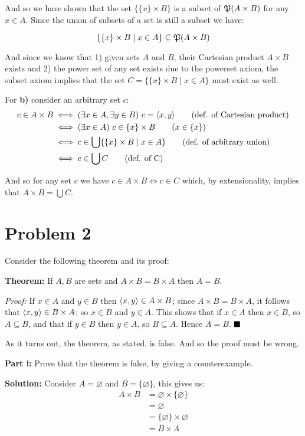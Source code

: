 \documentclass{article}
\begin{document}
And so we have shown that the set $\{\{x\}\times B\}$ is a subset of $\mathfrak P(A\times B)$ for any $x\in A$. Since the union of subsets of a set is still a subset we have:

\begin{equation*}
    \{\{x\}\times B\mid x\in A\}\subseteq \mathfrak P(A\times B)
\end{equation*}

And since we know that 1) given sets $A$ and $B$, their Cartesian product $A\times B$ exists and 2) the power set of any set exists due to the powerset axiom, the subset axiom implies that the set $C=\{\{x\}\times B\mid x\in A\}$ must exist as well.
\medskip

For \textbf{b)} consider an arbitrary set $c$:
\begin{align*}
    c\in A\times B&\iff(\exists x\in A,\exists y\in B)\,\,c=\pair{x}{y}\tag{def. of Cartesian product}\\
    &\iff(\exists x\in A)\,\,c\in\{x\}\times B\tag{$x\in\{x\}$}\\
    &\iff c\in\bigcup\{\{x\}\times B\mid x\in A\}\tag{def. of arbitrary union}\\
    &\iff c\in \bigcup C\tag{def. of C}
\end{align*}

And so for any set $c$ we have $c\in A\times B\iff c\in C$ which, by extensionality, implies that $A\times B=\bigcup C$.

\section*{Problem 2}
Consider the following theorem and its proof:
\bigskip

\textbf{Theorem:} If $A,B$ are sets and $A\times B = B\times A$ then $A = B$.
\bigskip

\textit{Proof:} If $x\in A$ and $y\in B$ then $\langle x,y\rangle\in A\times B$; since $A\times B = B\times A$, it follows that $\langle x,y\rangle\in B\times A$; so $x\in B$ and $y\in A$. This shows that if $x\in A$ then $x\in B$, so $A\subseteq B$, and that if $y\in B$ then $y\in A$, so $B\subseteq A$.
Hence $A = B$. $\hfill\ensuremath{\blacksquare}$
\bigskip

As it turns out, the theorem, as stated, is false. And so the proof must be wrong.
\bigskip

\noindent\textbf{Part i:} Prove that the theorem is false, by giving a counterexample.
\bigskip

\noindent\textbf{Solution:} Consider $A=\varnothing$ and $B=\{\varnothing\}$, this gives us:
\begin{align*}
    A\times B&=\varnothing\times\{\varnothing\}\\
    &=\varnothing\\
    &=\{\varnothing\}\times\varnothing\\
    &=B\times A
\end{align*}
\end{document}
